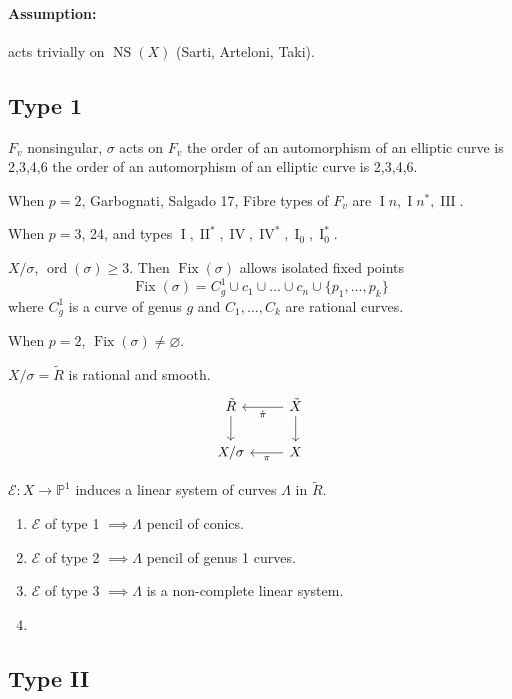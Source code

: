 \paragraph{Assumption:} acts trivially on $\operatorname{NS}(X)$ (Sarti, Arteloni, Taki).

\subsection{Type 1}
$F_v$ nonsingular, $\sigma$ acts on $F_v$ the order of an automorphism of an elliptic curve is 2,3,4,6 the order of an automorphism of an elliptic curve is 2,3,4,6.

When $p=2$, Garbognati, Salgado 17, Fibre types of  $F_v$ are $\operatorname{I}n,\operatorname{I}n^* ,\operatorname{I I I}$.

When $p=3$, 24, and types $\operatorname{I},\operatorname{I I}^* ,\operatorname{IV},\operatorname{IV}^* ,\operatorname{I}_{0},\operatorname{I}_{0}^*$.

$X/\sigma$, $\operatorname{ord}(\sigma)\geq 3$. Then $\operatorname{Fix}(\sigma)$ allows isolated fixed points
\[\operatorname{Fix}(\sigma)=C^1_g \cup c_1\cup \ldots \cup c_n\cup \{p_1,\ldots,p_k\}\]
where $C^1_g$ is a curve of genus $g$ and $C_1,\ldots,C_k$ are rational curves.

When $p=2$, $\operatorname{Fix}(\sigma)\neq \varnothing$.

$X/\sigma=\tilde{R}$ is rational and smooth.
\[\begin{tikzcd}
	\tilde{R}\arrow[d]&\tilde{X}\arrow[l,"\hat{\pi}"]\arrow[d]\\
	X/\sigma & X\arrow[l,"\pi"]
\end{tikzcd}\]

$ \mathcal{E}:X\to \mathbb{P}^1$ induces a linear system of curves $\Lambda$ in $\tilde{R}$.

\begin{enumerate}
	\item  $\mathcal{E}$ of type 1 $\implies \Lambda$ pencil of conics.
	\item $\mathcal{E}$ of type 2 $\implies \Lambda$ pencil of genus 1 curves.
	\item $\mathcal{E}$ of type 3 $\implies \Lambda$ is a non-complete linear system.

	\item 
\end{enumerate}

\subsection{Type II}

